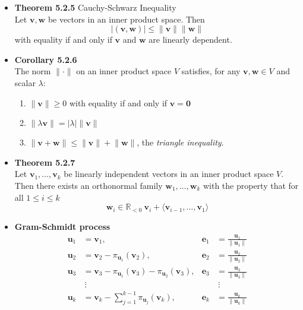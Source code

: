 \documentclass[11pt,a4paper]{article}
\begin{document}
\begin{itemize}
    \item \textbf{Theorem 5.2.5} Cauchy-Schwarz Inequality \\
        Let $\mathbf{v}, \mathbf{w}$ be vectors in an inner product space. Then
        \[
            |(\mathbf{v}, \mathbf{w})| \leq \lVert \mathbf{v} \rVert \lVert \mathbf{w} \rVert
        \]
        with equality if and only if $\mathbf{v}$ and $\mathbf{w}$ are linearly dependent.

    \item \textbf{Corollary 5.2.6} \\
        The norm $\lVert \cdot \rVert$ on an inner product space $V$ satisfies,
        for any $\mathbf{v}, \mathbf{w} \in V$ and scalar $\lambda$:
        \begin{enumerate}
            \item $\lVert \mathbf{v} \rVert \geq 0$ with equality if and only if
                $\mathbf{v} = \mathbf{0}$
            \item $\lVert \lambda \mathbf{v} \rVert = |\lambda| \lVert \mathbf{v} \rVert$
            \item $\lVert \mathbf{v} + \mathbf{w} \rVert \leq
                \lVert \mathbf{v} \rVert + \lVert \mathbf{w} \rVert$,
                the \emph{triangle inequality}.
        \end{enumerate}

    \item \textbf{Theorem 5.2.7} \\
        Let $\mathbf{v}_1, \ldots, \mathbf{v}_k$ be linearly independent vectors in an
        inner product space $V$.
        Then there exists an orthonormal family $\mathbf{w}_1, \ldots, \mathbf{w}_k$
        with the property that for all $1 \leq i \leq k$
        \[
            \mathbf{w}_i \in \mathbb{R}_{<0} \ \mathbf{v}_i +
            \langle \mathbf{v}_{i-1}, \ldots, \mathbf{v}_1 \rangle
        \]

    \item \textbf{Gram-Schmidt process}
        \begin{align*}{}
            \mathbf{u}_1 &= \mathbf{v}_1, & \mathbf{e}_1
                         &= \frac{\mathbf{u}_1}{\lVert \mathbf{u}_1 \rVert} \\
            \mathbf{u}_2 &= \mathbf{v}_2 - \pi_{\mathbf{u}_1}(\mathbf{v}_2), & \mathbf{e}_2
                         &= \frac{\mathbf{u}_2}{\lVert \mathbf{u}_2 \rVert} \\
            \mathbf{u}_3 &= \mathbf{v}_3 - \pi_{\mathbf{u}_1}(\mathbf{v}_3) -
            \pi_{\mathbf{u}_2}(\mathbf{v}_3), & \mathbf{e}_3 &=
            \frac{\mathbf{u}_3}{\lVert \mathbf{u}_3 \rVert} \\
                                              & \ \vdots & & \ \vdots \\
            \mathbf{u}_k &= \mathbf{v}_k - \sum_{j=1}^{k-1} \pi_{\mathbf{u}_j} (\mathbf{v}_k),
                         & \mathbf{e}_k &= \frac{\mathbf{u}_k}{\lVert \mathbf{u}_k \rVert}
        \end{align*}

\end{itemize}
\end{document}
